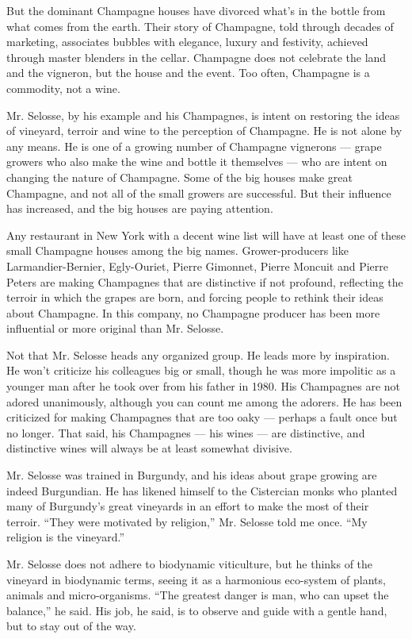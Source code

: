 But the dominant Champagne houses have divorced what's in the bottle
from what comes from the earth. Their story of Champagne, told through
decades of marketing, associates bubbles with elegance, luxury and
festivity, achieved through master blenders in the cellar. Champagne
does not celebrate the land and the vigneron, but the house and the
event. Too often, Champagne is a commodity, not a wine.

Mr. Selosse, by his example and his Champagnes, is intent on restoring
the ideas of vineyard, terroir and wine to the perception of Champagne.
He is not alone by any means. He is one of a growing number of Champagne
vignerons --- grape growers who also make the wine and bottle it
themselves --- who are intent on changing the nature of Champagne. Some
of the big houses make great Champagne, and not all of the small growers
are successful. But their influence has increased, and the big houses
are paying attention.

Any restaurant in New York with a decent wine list will have at least
one of these small Champagne houses among the big names.
Grower-producers like Larmandier-Bernier, Egly-Ouriet, Pierre Gimonnet,
Pierre Moncuit and Pierre Peters are making Champagnes that are
distinctive if not profound, reflecting the terroir in which the grapes
are born, and forcing people to rethink their ideas about Champagne. In
this company, no Champagne producer has been more influential or more
original than Mr. Selosse.

Not that Mr. Selosse heads any organized group. He leads more by
inspiration. He won't criticize his colleagues big or small, though he
was more impolitic as a younger man after he took over from his father
in 1980. His Champagnes are not adored unanimously, although you can
count me among the adorers. He has been criticized for making Champagnes
that are too oaky --- perhaps a fault once but no longer. That said, his
Champagnes --- his wines --- are distinctive, and distinctive wines will
always be at least somewhat divisive.

Mr. Selosse was trained in Burgundy, and his ideas about grape growing
are indeed Burgundian. He has likened himself to the Cistercian monks
who planted many of Burgundy's great vineyards in an effort to make the
most of their terroir. ``They were motivated by religion,'' Mr. Selosse
told me once. ``My religion is the vineyard.''

Mr. Selosse does not adhere to biodynamic viticulture, but he thinks of
the vineyard in biodynamic terms, seeing it as a harmonious eco-system
of plants, animals and micro-organisms. ``The greatest danger is man,
who can upset the balance,'' he said. His job, he said, is to observe
and guide with a gentle hand, but to stay out of the way.

